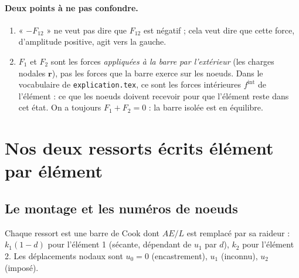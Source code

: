 \documentclass[11pt,a4paper]{article}
\newcommand{\kun}{k_1(1-d)}
\begin{document}
\paragraph{Deux points à ne pas confondre.}
\begin{enumerate}[nosep]
  \item « $-F_{12}$ » ne veut pas dire que $F_{12}$ est négatif ; cela veut dire que cette force,
        d'amplitude positive, agit vers la gauche.
  \item $F_1$ et $F_2$ sont les forces \emph{appliquées à la barre par l'extérieur} (les charges
        nodales $\mathbf r$), pas les forces que la barre exerce sur les noeuds. Dans le
        vocabulaire de \texttt{explication.tex}, ce sont les forces intérieures $f^{\text{int}}$ de
        l'élément : ce que les noeuds doivent recevoir pour que l'élément reste dans cet état.
        On a toujours $F_1 + F_2 = 0$ : la barre isolée est en équilibre.
\end{enumerate}

\section{Nos deux ressorts écrits élément par élément}

\subsection{Le montage et les numéros de noeuds}
\begin{center}
\end{center}
Chaque ressort est une barre de Cook dont $AE/L$ est remplacé par sa raideur : $\kun$ pour
l'élément 1 (sécante, dépendant de $u_1$ par $d$), $k_2$ pour l'élément 2. Les déplacements
nodaux sont $u_0 = 0$ (encastrement), $u_1$ (inconnu), $u_2$ (imposé).
\end{document}
